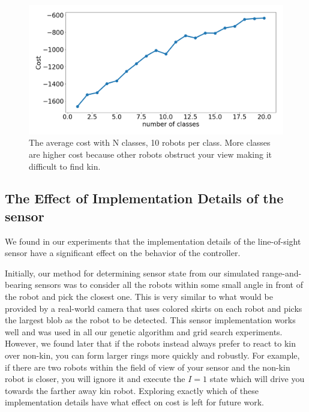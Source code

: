\documentclass[conference]{IEEEtran}
\begin{document}
    \begin{figure}[H]
      \centering
      \includegraphics[width=1\linewidth]{./images/num_classes_vs_cost_10_per_class.png}
      \caption{The average cost with N classes, 10 robots per class. More classes are higher cost because other robots obstruct your view making it difficult to find kin.}
      \label{fig:num_classes_10}
    \end{figure}

  \subsection{The Effect of Implementation Details of the sensor} \label{section:sensor_impl}

    We found in our experiments that the implementation details of the line-of-sight sensor have a significant effect on the behavior of the controller.

    Initially, our method for determining sensor state from our simulated range-and-bearing sensors was to consider all the robots within some small angle in front of the robot and pick the closest one. This is very similar to what would be provided by a real-world camera that uses colored skirts on each robot and picks the largest blob as the robot to be detected. This sensor implementation works well and was used in all our genetic algorithm and grid search experiments. However, we found later that if the robots instead always prefer to react to kin over non-kin, you can form larger rings more quickly and robustly. For example, if there are two robots within the field of view of your sensor and the non-kin robot is closer, you will ignore it and execute the $I=1$ state which will drive you towards the farther away kin robot. Exploring exactly which of these implementation details have what effect on cost is left for future work.
\end{document}

